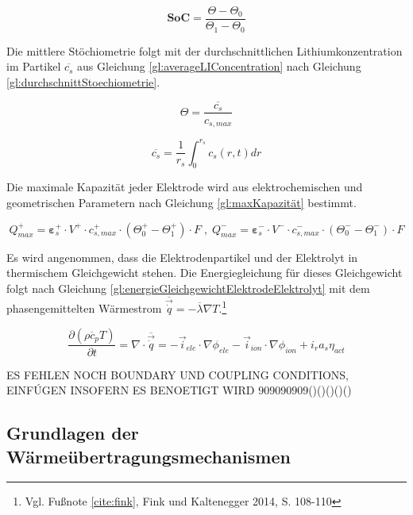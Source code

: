 \begin{equation}
	\mathbf{SoC} = \frac{\Theta - \Theta_{0}}{\Theta_{1} - \Theta_{0}} \label{gl:SOCDef}
\end{equation}

Die mittlere Stöchiometrie folgt mit der durchschnittlichen Lithiumkonzentration im Partikel $\overline{c_{s}}$ aus Gleichung \ref{gl:averageLIConcentration} nach Gleichung \ref{gl:durchschnittStoechiometrie}.

\begin{equation}
	\Theta = \frac{\overline{c_{s}}}{c_{s,max}} \label{gl:durchschnittStoechiometrie}
\end{equation}

\begin{equation}
	\overline{c_{s}} = \frac{1}{r_{s}} \int_{0}^{r_{s}} c_{s}(r,t) dr \label{gl:averageLIConcentration}
\end{equation}

Die maximale Kapazität jeder Elektrode wird aus elektrochemischen und geometrischen Parametern nach Gleichung \ref{gl:maxKapazität} bestimmt.

\begin{equation}
	Q^{+}_{max} = \mathbf{\varepsilon}^{+}_{s}\cdot V^{+} \cdot c_{s,max}^{+} \cdot (\Theta^{+}_{0} - \Theta^{+}_{1}) \cdot F \; , \; Q^{-}_{max} =  \mathbf{\varepsilon}^{-}_{s}\cdot V^{-}\cdot c^{-}_{s,max}\cdot (\Theta^{-}_{0} - \Theta^{-}_{1}) \cdot F \label{gl:maxKapazität}
\end{equation}

Es wird angenommen, dass die Elektrodenpartikel und der Elektrolyt in thermischem Gleichgewicht stehen. Die Energiegleichung für dieses Gleichgewicht folgt nach Gleichung \ref{gl:energieGleichgewichtElektrodeElektrolyt} mit dem phasengemittelten Wärmestrom $\overline{\vec{\dot{q}}} = -\overline{\lambda} \nabla T$.\footnote{Vgl. Fußnote \ref{cite:fink}, Fink und Kaltenegger 2014, S. 108-110}

\begin{equation}
	\frac{\partial (\overline{\rho c_{p}} T)}{\partial t} = \nabla \cdot \overline{\vec{\dot{q}}} = - \vec{i}_{ele} \cdot \nabla \phi_{ele} - \vec{i}_{ion} \cdot \nabla \phi_{ion} + i_{r} a_{s} \eta_{act} \label{gl:energieGleichgewichtElektrodeElektrolyt}
\end{equation}


ES FEHLEN NOCH BOUNDARY UND COUPLING CONDITIONS, EINFÚGEN INSOFERN ES BENOETIGT WIRD 909090909()()()()()

\newpage
\subsection{Grundlagen der Wärmeübertragungsmechanismen}\label{sub:waermeuebertragung}

